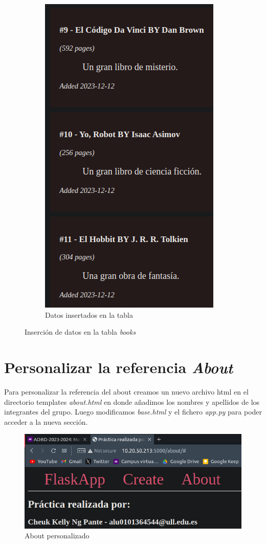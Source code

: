 \documentclass[11pt]{report}
\begin{document}
\begin{figure}[H]
\begin{subfigure}{0.5\textwidth}
    \centering
    \includegraphics[scale=0.4]{img/inserted_books_2.png}
    \caption{Datos insertados en la tabla}
  \end{subfigure}
  \caption{Inserción de datos en la tabla \emph{books}}
\end{figure}

\section{Personalizar la referencia \emph{About}}
Para personalizar la referencia del about creamos un nuevo archivo html en el directorio
templates \emph{about.html} en donde añadimos los nombres y apellidos de los integrantes del
grupo. Luego modificamos \emph{base.html} y el fichero \emph{app.py} para poder acceder a la nueva
sección.

\begin{figure}[H]
  \centering
  \includegraphics[scale=0.4]{img/about.png}
  \caption{About personalizado}
  \label{fig:about_personalizado}
\end{figure}
\end{document}
